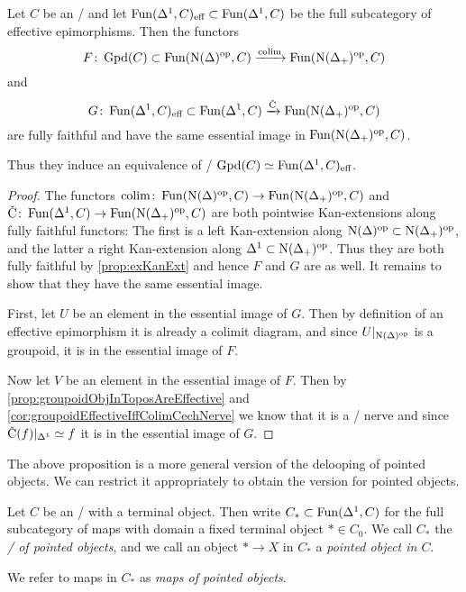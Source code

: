 \begin{prop}\label{prop:mayRecognitionTheoremGroupoid}
    Let $C$ be an \inftytop/ and let $\operatorname{Fun}(\Delta^1,C)_{\text{eff}}\subset\operatorname{Fun}(\Delta^1,C)$ be the full subcategory of effective epimorphisms.  
    Then the functors
    \begin{equation*}
        F\colon\operatorname{Gpd}(C)\subset\operatorname{Fun}(\operatorname{N}(\Delta)^{\operatorname{op}},C)\xrightarrow{\operatorname*{colim}}\operatorname{Fun}(\operatorname{N}(\Delta_+)^{\operatorname{op}},C)
    \end{equation*}
    and 
    \begin{equation*}
        G\colon\Fun(\Delta^1,C)_{\text{eff}}\subset\Fun(\Delta^1,C)\xrightarrow{\CN}\Fun(\N(\Delta_+)^{\op},C)
    \end{equation*}
    are fully faithful and have the same essential image in $\operatorname{Fun}(\operatorname{N}(\Delta_+)^{\operatorname{op}},C)$.
    
    Thus they induce an equivalence of \inftycats/ $\operatorname{Gpd}(C)\simeq\operatorname{Fun}(\Delta^1,C)_{\text{eff}}$.
    \begin{proof}
        The functors $\operatorname*{colim}\colon\operatorname{Fun}(\operatorname{N}(\Delta)^{\operatorname{op}},C)\to\operatorname{Fun}(\operatorname{N}(\Delta_+)^{\operatorname{op}},C)$ and $\CN\colon\Fun(\Delta^1,C)\to\Fun(\N(\Delta_+)^{\op},C)$ are both pointwise Kan-extensions along fully faithful functors:
        The first is a left Kan-extension along $\operatorname{N}(\Delta)^{\operatorname{op}}\subset\operatorname{N}(\Delta_+)^{\operatorname{op}}$, and the latter a right Kan-extension along $\Delta^1\subset\operatorname{N}(\Delta_+)^{\operatorname{op}}$.
        Thus they are both fully faithful by \cref{prop:exKanExt} and hence $F$ and $G$ are as well.
        It remains to show that they have the same essential image.

        First, let $U$ be an element in the essential image of $G$. 
        Then by definition of an effective epimorphism it is already a colimit diagram, and since $U|_{\operatorname{N}(\Delta)^{\operatorname{op}}}$ is a groupoid, it is in the essential image of $F$.

        Now let $V$ be an element in the essential image of $F$. 
        Then by \cref{prop:groupoidObjInToposAreEffective} and \cref{cor:groupoidEffectiveIffColimCechNerve} we know that it is a \Cech/ nerve and since $\CN(f)|_{\Delta^1}\simeq f$ it is in the essential image of $G$.
    \end{proof}
\end{prop}
The above proposition is a more general version of the delooping of pointed objects.
We can restrict it appropriately to obtain the version for pointed objects.
\begin{definition}
    Let $C$ be an \inftycat/ with a terminal object.
    Then write $C_*\subset\operatorname{Fun}(\Delta^1,C)$ for the full subcategory of maps with domain a fixed terminal object $*\in C_0$.
    We call $C_*$ the \emph{\inftycat/ of pointed objects}, and we call an object $*\to X$ in $C_*$ a \emph{pointed object in $C$}.

    We refer to maps in $C_*$ as \emph{maps of pointed objects}.
\end{definition}
